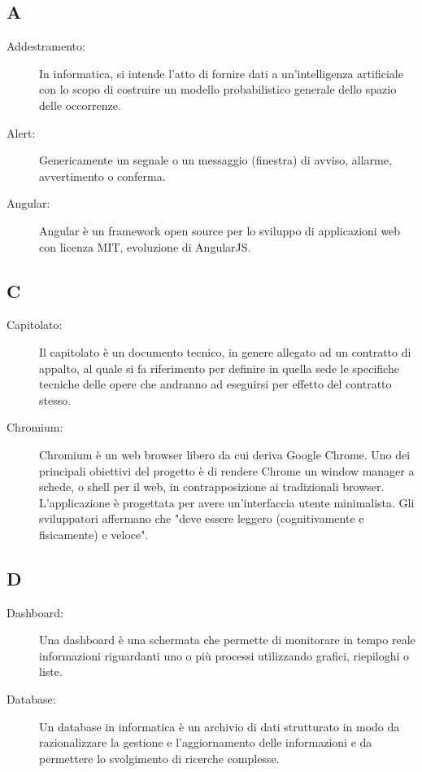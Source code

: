 \documentclass[../manuale-sviluppatore.tex]{subfiles}
\begin{document}
\subsection*{A}
\begin{description}
    \item[Addestramento:] In informatica, si intende l'atto di fornire dati a un'intelligenza artificiale con lo scopo di costruire un modello probabilistico generale dello spazio delle occorrenze.
    \item[Alert:] Genericamente un segnale o un messaggio (finestra) di avviso, allarme, avvertimento o conferma.
    \item[Angular:] Angular è un framework open source per lo sviluppo di applicazioni web con licenza MIT, evoluzione di AngularJS.
\end{description}

\subsection*{C}
\begin{description}
  \item[Capitolato:] Il capitolato è un documento tecnico, in genere allegato ad un contratto di appalto, al quale si fa riferimento per definire in quella sede le specifiche tecniche delle opere che andranno ad eseguirsi per effetto del contratto stesso.
  \item[Chromium:] Chromium è un web browser libero da cui deriva Google Chrome.
Uno dei principali obiettivi del progetto è di rendere Chrome un window manager a schede, o shell per il web, in contrapposizione ai tradizionali browser. L'applicazione è progettata per avere un'interfaccia utente minimalista. Gli sviluppatori affermano che "deve essere leggero (cognitivamente e fisicamente) e veloce".
\end{description}

\subsection*{D}
\begin{description}
  \item[Dashboard:] Una dashboard è una schermata che permette di monitorare in tempo reale informazioni riguardanti uno o più processi utilizzando grafici, riepiloghi o liste.
  \item[Database:] Un database in informatica è un archivio di dati strutturato in modo da razionalizzare la gestione e l'aggiornamento delle informazioni e da permettere lo svolgimento di ricerche complesse.
\end{description}
\end{document}

